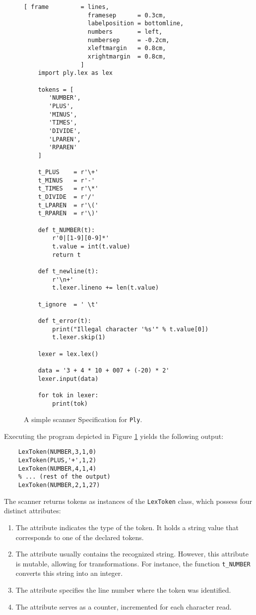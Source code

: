 \begin{figure}[!ht]
\centering
\begin{Verbatim}[ frame         = lines, 
                  framesep      = 0.3cm, 
                  labelposition = bottomline,
                  numbers       = left,
                  numbersep     = -0.2cm,
                  xleftmargin   = 0.8cm,
                  xrightmargin  = 0.8cm,
                ]
    import ply.lex as lex
    
    tokens = [
       'NUMBER',
       'PLUS',
       'MINUS',
       'TIMES',
       'DIVIDE',
       'LPAREN',
       'RPAREN'
    ]
    
    t_PLUS    = r'\+'
    t_MINUS   = r'-'
    t_TIMES   = r'\*'
    t_DIVIDE  = r'/'
    t_LPAREN  = r'\('
    t_RPAREN  = r'\)'
    
    def t_NUMBER(t):
        r'0|[1-9][0-9]*'
        t.value = int(t.value)
        return t
    
    def t_newline(t):
        r'\n+'
        t.lexer.lineno += len(t.value)
    
    t_ignore  = ' \t'
    
    def t_error(t):
        print("Illegal character '%s'" % t.value[0])
        t.lexer.skip(1)
    
    lexer = lex.lex()
    
    data = '3 + 4 * 10 + 007 + (-20) * 2'
    lexer.input(data)
    
    for tok in lexer:
        print(tok)
\end{Verbatim}
\vspace*{-0.3cm}
\caption{A simple scanner Specification for \texttt{Ply}.}
\label{fig:Ply-Example.ipynb}
\end{figure}

\noindent
Executing the program depicted in Figure \ref{fig:Ply-Example.ipynb} yields the following output:

\begin{verbatim}
    LexToken(NUMBER,3,1,0)
    LexToken(PLUS,'+',1,2)
    LexToken(NUMBER,4,1,4)
    % ... (rest of the output)
    LexToken(NUMBER,2,1,27)
\end{verbatim}
The scanner returns tokens as instances of the \texttt{LexToken} class, which possess four distinct attributes:
\begin{enumerate}
\item The  attribute indicates the type of the token. It holds a string value that
      corresponds to one of the declared tokens. 
\item The  attribute usually contains the recognized string. However, this attribute is
      mutable, allowing for transformations. For instance, the function \texttt{t\_NUMBER} converts this string
      into an integer. 
\item The  attribute specifies the line number where the token was identified.
\item The  attribute serves as a counter, incremented for each character read.
\end{enumerate}

